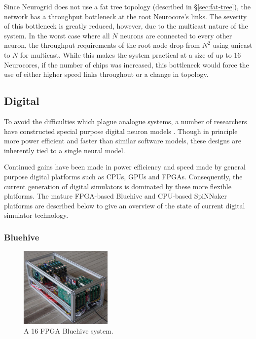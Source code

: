 				Since Neurogrid does not use a fat tree topology (described in
				\S\ref{sec:fat-tree}), the network has a throughput bottleneck at the
				root Neurocore's links. The severity of this bottleneck is greatly
				reduced, however, due to the multicast nature of the system. In the
				worst case where all $N$ neurons are connected to every other neuron,
				the throughput requirements of the root node drop from $N^2$ using
				unicast to $N$ for multicast. While this makes the system practical at a
				size of up to 16 Neurocores, if the number of chips was increased, this
				bottleneck would force the use of either higher speed links throughout
				or a change in topology.
			
			
		\subsection{Digital}
			
			
			To avoid the difficulties which plague analogue systems, a number of
			researchers have constructed special purpose digital neuron models
			\cite{prange93,jahnke96,schoenauer99,mehrtash03}. Though in principle more
			power efficient and faster than similar software models, these designs are
			inherently tied to a single neural model.
			
			Continued gains have been made in power efficiency and speed made by
			general purpose digital platforms such as CPUs, GPUs and FPGAs.
			Consequently, the current generation of digital simulators is dominated by
			these more flexible platforms. The mature FPGA-based Bluehive and
			CPU-based SpiNNaker platforms are described below to give an overview of
			the state of current digital simulator technology.
			
			\subsubsection{Bluehive}
				
				\begin{figure} \center
				\includegraphics[width=0.4\textwidth]{figures/bluehive}
					
					\caption{A 16 FPGA Bluehive system.} \label{fig:bluehive} \end{figure}
				
